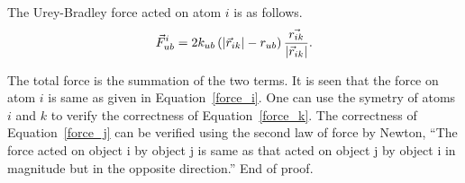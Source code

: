 The Urey-Bradley force acted on atom $i$ is as follows.
\begin{equation}
\vec{F}_{ub}^i = 2 k_{ub} \left(
\mbox{$\left| \vec{r}_{ik} \right| $} - r_{ub} \right) \frac{\vec{r_{ik}}}{\mbox{$\left| \vec{r}_{ik} \right| $}}.
\end{equation}

The total force is the summation of the two terms. It is seen that the
force on atom $i$ is same as given in Equation~{\ref{force_i}}. One
can use the symetry of atoms $i$ and $k$ to verify the correctness of 
Equation~{\ref{force_k}}. The correctness of Equation~{\ref{force_j}}
can be verified using the second law of force by Newton, ``The force
acted on object i by object j is same as that acted on object j by
object i in magnitude but in the opposite direction.'' End of proof.






